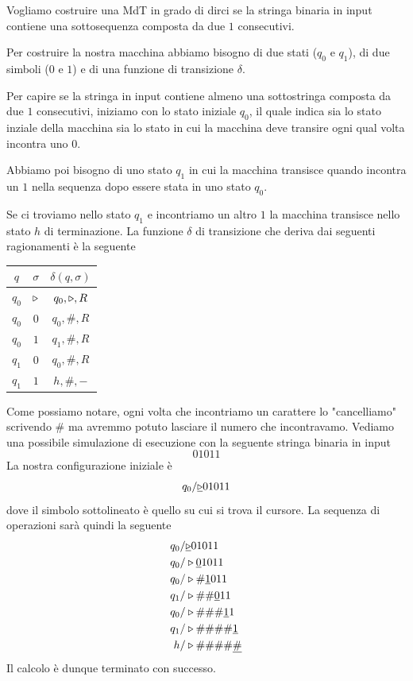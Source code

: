 \begin{example} \label{ex: 11}
	Vogliamo costruire una MdT in grado di dirci se la stringa
	binaria in input contiene una sottosequenza composta da
	due $1$ consecutivi.

	Per costruire la nostra macchina abbiamo bisogno di due
	stati ($q_0$ e $q_1$), di due simboli ($0$ e $1$) e di
	una funzione di transizione $\delta$.

	Per capire se la stringa in input contiene almeno una
	sottostringa composta da due $1$ consecutivi, iniziamo
	con lo stato iniziale $q_0$, il quale indica sia lo stato
	inziale della macchina sia lo stato in cui la macchina
	deve transire ogni qual volta incontra uno $0$.

	Abbiamo poi bisogno di uno stato $q_1$ in cui la macchina
	transisce quando incontra un $1$ nella sequenza dopo essere
	stata in uno stato $q_0$.

	Se ci troviamo nello stato $q_1$ e incontriamo un altro $1$
	la macchina transisce nello stato $h$ di terminazione. La
	funzione $\delta$ di transizione che deriva dai seguenti
	ragionamenti è la seguente
	\begin{center}
		\begin{tabular}{|c|c|c|}
			\hline
			$q$   & $\sigma$ & $\delta(q, \sigma)$ \\
			\hline
			$q_0$ & $\triangleright$ & $q_0, \triangleright, R$    \\
			$q_0$ & $0$      & $q_0, \#, R$        \\
			$q_0$ & $1$      & $q_1, \#, R$        \\
			$q_1$ & $0$      & $q_0, \#, R$        \\
			$q_1$ & $1$      & $h, \#, -$          \\
			\hline
		\end{tabular}
	\end{center}
	Come possiamo notare, ogni volta che incontriamo un
	carattere lo "cancelliamo" scrivendo $\#$ ma avremmo potuto
	lasciare il numero che incontravamo. Vediamo una possibile
	simulazione di esecuzione con la seguente stringa binaria
	in input
	\[ 01011 \]
	La nostra configurazione iniziale è
	\[ q_0 / \underline{\triangleright} 01011 \]
	dove il simbolo sottolineato è quello su cui si trova il
	cursore. La sequenza di operazioni sarà quindi la seguente
	\begin{align*}
		q_0 / & \underline{\triangleright} 01011       \\
		q_0 / & \triangleright \underline{0} 1011      \\
		q_0 / & \triangleright \# \underline{1} 011    \\
		q_1 / & \triangleright \#\# \underline{0} 11   \\
		q_0 / & \triangleright \#\#\# \underline{1} 1  \\
		q_1 / & \triangleright \#\#\#\# \underline{1}  \\
		h /   & \triangleright \#\#\#\# \underline{\#}
	\end{align*}
	Il calcolo è dunque terminato con successo.
\end{example}

